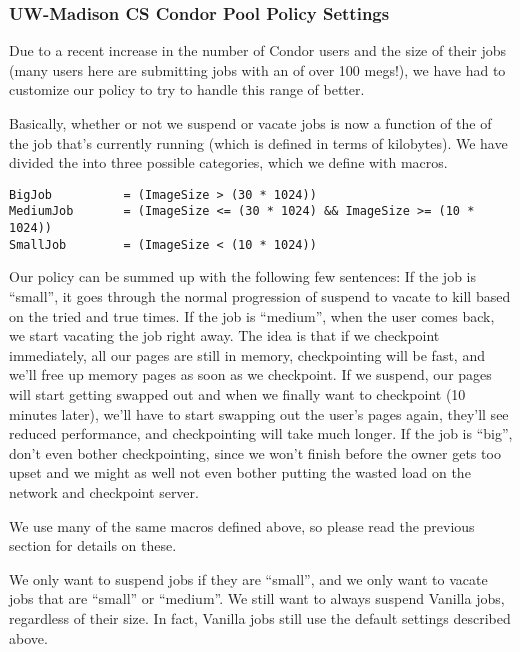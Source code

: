 \subsubsection{UW-Madison CS Condor Pool Policy Settings}
\label{sec:UW-Policy}

Due to a recent increase in the number of Condor users and the size of
their jobs (many users here are submitting jobs with an
 of over 100 megs!), we have had to customize our
policy to try to handle this range of  better.

Basically, whether or not we suspend or vacate jobs is now a function
of the  of the job that's currently running (which is
defined in terms of kilobytes).  We have divided the 
into three possible categories, which we define with macros.

\begin{verbatim}
BigJob          = (ImageSize > (30 * 1024))
MediumJob       = (ImageSize <= (30 * 1024) && ImageSize >= (10 * 1024))
SmallJob        = (ImageSize < (10 * 1024))
\end{verbatim}

Our policy can be summed up with the following few sentences: If the
job is ``small'', it goes through the normal progression of suspend to
vacate to kill based on the tried and true times.  If the job is
``medium'', when the user comes back, we start vacating the job right
away.  The idea is that if we checkpoint immediately, all our pages
are still in memory, checkpointing will be fast, and we'll free up
memory pages as soon as we checkpoint.  If we suspend, our pages will
start getting swapped out and when we finally want to checkpoint (10
minutes later), we'll have to start swapping out the user's pages
again, they'll see reduced performance, and checkpointing will take
much longer.  If the job is ``big'', don't even bother checkpointing,
since we won't finish before the owner gets too upset and we might as
well not even bother putting the wasted load on the network and
checkpoint server.

We use many of the same macros defined above, so please read the
previous section for details on these.

We only want to suspend jobs if they are ``small'', and we only want
to vacate jobs that are ``small'' or ``medium''.  We still want to
always suspend Vanilla jobs, regardless of their size.  In fact,
Vanilla jobs still use the default settings described above.

